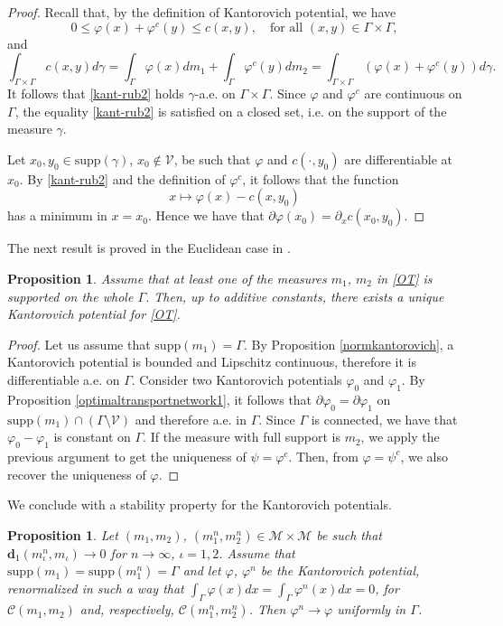\documentclass[smallextended,referee,envcountsect,]{svjour3}
\newcommand{\lra}{\longrightarrow}
\newcommand{\Wass}{\mathbf{d}}
\newcommand{\G}{\Gamma}
\newcommand{\cC}{{\mathcal C}}
\newcommand{\cM}{{\mathcal M}}
\newcommand{\cV}{{\mathcal V}}
\renewcommand{\phi}{\varphi}
\newcommand{\supp}{\mathrm{supp}}
\newtheorem{prop}[theo]{\bf Proposition}
\begin{document}
\begin{proof}
Recall that, by the definition of Kantorovich potential, we have
	\begin{equation*}%
 0\le	\phi(x)+\phi^c(y)\leq c(x, y),\quad\text{for all }(x, y)\in\Gamma\times\Gamma,
	\end{equation*}
	and
	$$
	\int_{\Gamma\times\Gamma}c(x,y)d\gamma=\int_{\Gamma}\phi(x) dm_1+\int_{\Gamma}\phi^c(y)dm_2=\int_{\Gamma\times\Gamma}(\phi(x)+\phi^c(y))d\gamma.
	$$
	It follows that \eqref{kant-rub2} holds $\gamma$-a.e. on $\G\times\Gamma$. Since $\phi$ and $\phi^c$ are continuous on $\Gamma$, the equality \eqref{kant-rub2} is satisfied on a closed set, i.e. on the support of the measure $\gamma$.
	\par
	Let   $x_0, y_0\in \supp(\gamma)$, $x_0\not\in \cV$, be such that $\phi$ and $c(\cdot, y_0)$ are differentiable at $x_0$. By \eqref{kant-rub2} and the definition of $\phi^c$, it  follows that the function
	$$
	x\longmapsto\phi(x)-c(x, y_0)
	$$
	has a minimum in $x=x_0$. Hence  we have that $\partial\phi(x_0)=\partial_xc(x_0, y_0)$.
\end{proof}
The next result is proved in the Euclidean case in \cite[Proposition 7.18]{santambrogio}.
\begin{prop}	\label{optimaltransportnetwork2}
	Assume  that at least one of the measures $m_1$, $m_2$ in \eqref{OT} is supported on the whole $\Gamma$. Then, up to additive constants, there exists  a unique Kantorovich potential for  \eqref{OT}.
\end{prop}
\begin{proof}
Let us assume that $\supp(m_1)=\Gamma$. By Proposition \ref{normkantorovich}, a Kantorovich potential is bounded and Lipschitz continuous,  therefore it is differentiable a.e. on $\G$. Consider two  Kantorovich potentials $\phi_0$ and $\phi_1$. By Proposition \ref{optimaltransportnetwork1}, it follows that $\partial\phi_0=\partial\phi_1$ on $\supp(m_1)\cap (\G\setminus\cV)$ and therefore a.e. in $\Gamma$.  Since $\Gamma$ is connected, we have that $\phi_0-\phi_1$ is constant on $\G$. If the measure with full support is $m_2$, we  apply the previous argument to get the uniqueness of $\psi=\phi^c$. Then, from $\phi=\psi^c$, we also recover the uniqueness of $\phi$.
\end{proof}
We conclude with a stability property for the Kantorovich potentials.
\begin{prop}\label{prop:stability_pot}
	Let $(m_1,m_2)$, $(m^n_1,m^n_2)\in \cM\times \cM$ be such that $\Wass_1(m^n_\iota,m_\iota)\lra 0$ for $n\to\infty$, $\iota=1,2$. Assume that $\supp(m_1)=\supp(m^n_1)=\Gamma$ and let $\phi$, $\phi^n$ be  the Kantorovich potential, renormalized in such a way that $\int_\G \phi(x)dx=\int_\G\phi^n(x)dx=0$, for $ \cC(m_1,m_2)$ and, respectively, $ \cC(m^n_1,m^n_2)$.
	Then $\phi^n\lra\phi$   uniformly in $\G$.
\end{prop} 
\end{document}
